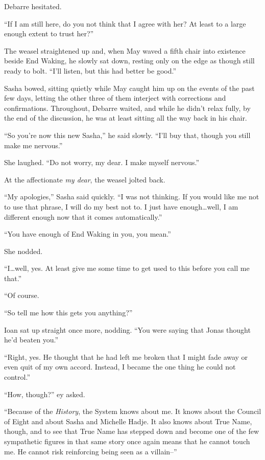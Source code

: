 Debarre hesitated.

``If I am still here, do you not think that I agree with her? At least to a large enough extent to trust her?''

The weasel straightened up and, when May waved a fifth chair into existence beside End Waking, he slowly sat down, resting only on the edge as though still ready to bolt. ``I'll listen, but this had better be good.''

Sasha bowed, sitting quietly while May caught him up on the events of the past few days, letting the other three of them interject with corrections and confirmations. Throughout, Debarre waited, and while he didn't relax fully, by the end of the discussion, he was at least sitting all the way back in his chair.

``So you're now this new Sasha,'' he said slowly. ``I'll buy that, though you still make me nervous.''

She laughed. ``Do not worry, my dear. I make myself nervous.''

At the affectionate \emph{my dear}, the weasel jolted back.

``My apologies,'' Sasha said quickly. ``I was not thinking. If you would like me not to use that phrase, I will do my best not to. I just have enough\ldots well, I am different enough now that it comes automatically.''

``You have enough of End Waking in you, you mean.''

She nodded.

``I\ldots well, yes. At least give me some time to get used to this before you call me that.''

``Of course.

``So tell me how this gets you anything?''

Ioan sat up straight once more, nodding. ``You were saying that Jonas thought he'd beaten you.''

``Right, yes. He thought that he had left me broken that I might fade away or even quit of my own accord. Instead, I became the one thing he could not control.''

``How, though?'' ey asked.

``Because of the \emph{History}, the System knows about me. It knows about the Council of Eight and about Sasha and Michelle Hadje. It also knows about True Name, though, and to see that True Name has stepped down and become one of the few sympathetic figures in that same story once again means that he cannot touch me. He cannot risk reinforcing being seen as a villain--''

